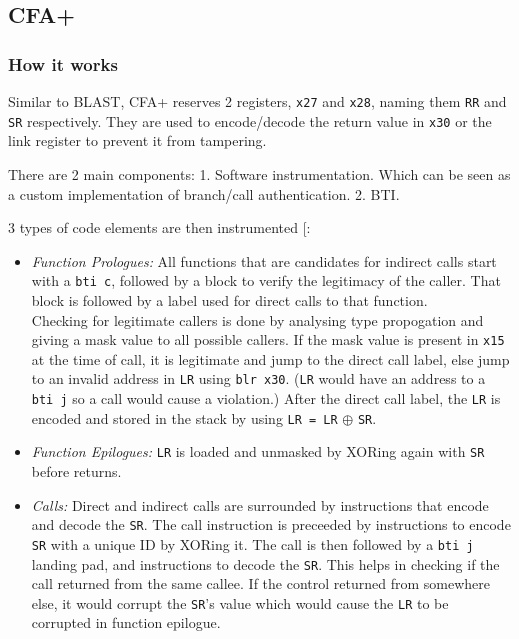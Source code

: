 \documentclass[a4paper, nobind]{templates/ociamthesis}
\providecommand{\tightlist}{%
  \setlength{\itemsep}{0pt}\setlength{\parskip}{0pt}}
\begin{document}
\subsection{CFA+}\label{cfa-1}

\subsubsection{How it works}\label{how-it-works-1}

Similar to BLAST, CFA+ reserves 2 registers, \texttt{x27} and \texttt{x28}, naming them
\texttt{RR} and \texttt{SR} respectively. They are used to encode/decode the return value in
\texttt{x30} or the link register to prevent it from tampering.

There are 2 main components: 1. Software instrumentation. Which can be seen as
a custom implementation of branch/call authentication. 2. BTI.

3 types of code elements are then instrumented {[}\citeproc{ref-cfaplus}{4}{]}:

\begin{itemize}
\tightlist
\item
  \emph{Function Prologues:}
  All functions that are candidates for indirect calls start
  with a \texttt{bti\ c}, followed by a block to verify the legitimacy of the caller.
  That block is followed by a label used for direct calls to that function.\\
  Checking for legitimate callers is done by analysing type propogation and giving
  a mask value to all possible callers. If the mask value is present in \texttt{x15} at
  the time of call, it is legitimate and jump to the direct call label,
  else jump to an invalid address in \texttt{LR} using \texttt{blr\ x30}.
  (\texttt{LR} would have an address to a \texttt{bti\ j} so a call would cause a violation.)
  After the direct call label, the \texttt{LR} is encoded and stored in the stack by using
  \texttt{LR\ =\ LR} \(\oplus\) \texttt{SR}.
\item
  \emph{Function Epilogues:}
  \texttt{LR} is loaded and unmasked by XORing again with \texttt{SR} before returns.
\item
  \emph{Calls:}
  Direct and indirect calls are surrounded by instructions that encode and decode the \texttt{SR}.
  The call instruction is preceeded by instructions to encode \texttt{SR} with a unique ID by XORing it.
  The call is then followed by a \texttt{bti\ j} landing pad, and instructions to decode the \texttt{SR}.
  This helps in checking if the call returned from the same callee.
  If the control returned from somewhere else, it would corrupt the
  \texttt{SR}'s value which would cause the \texttt{LR} to be corrupted in function epilogue.
\end{itemize}
\end{document}
